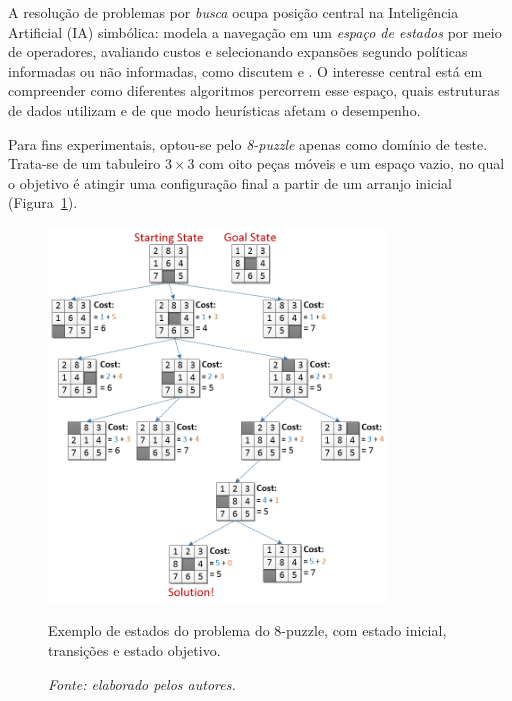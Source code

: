 
A resolução de problemas por \emph{busca} ocupa posição central na Inteligência Artificial (IA) simbólica: modela a 
navegação em um \emph{espaço de estados} por meio de operadores, avaliando custos e selecionando expansões 
segundo políticas informadas ou não informadas, como discutem  e 
. O interesse central está em compreender como diferentes algoritmos percorrem esse espaço, 
quais estruturas de dados utilizam e de que modo heurísticas afetam o desempenho.

Para fins experimentais, optou-se pelo \emph{8-puzzle} apenas como domínio de teste. Trata-se de um tabuleiro 
$3\times 3$ com oito peças móveis e um espaço vazio, no qual o objetivo é atingir uma configuração final a partir 
de um arranjo inicial (Figura~\ref{fig:8puzzle}). 

\begin{figure}[H]
    \centering
    \includegraphics[width=0.8\textwidth]{Imagens/8puzzle7.png}
    \caption{Exemplo de estados do problema do 8-puzzle, com estado inicial, transições e estado objetivo.}
    \caption*{\textit{Fonte: elaborado pelos autores.}}
    \label{fig:8puzzle}
\end{figure}


